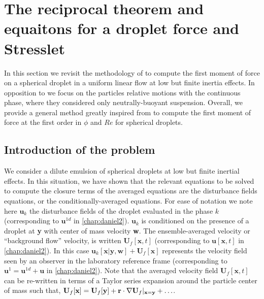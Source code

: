 \section{The reciprocal theorem and equaitons for a droplet force and Stresslet}
\label{ap:reciprocal}


In this section we revisit the methodology of \citet{stone2001inertial,raja2010inertial,jiang2021inertial}  to compute the first moment of force on a spherical droplet in a uniform linear flow at low but finite inertia effects. 
In opposition to \citet{stone2001inertial,raja2010inertial} we focus on the particles relative motions with the continuous phase, where they considered only neutrally-buoyant suspension. 
Overall, we provide a general method greatly inspired from \citet{stone2001inertial} to compute the first moment of force at the first order in $\phi$ and $Re$ for spherical droplets. 


\subsection{Introduction of the problem}

We consider a dilute emulsion of spherical droplets at low but finite inertial effects. 
In this situation, we have shown that the relevant equations to be solved to compute the closure terms of the averaged equations are the disturbance fields equations, or the conditionally-averaged equations. 
For ease of notation we note here $\textbf{u}_k$ the disturbance fields of the droplet evaluated in the phase $k$ (corresponding to $\textbf{u}^{1d}$ in \ref{chap:daniel2}). 
$\textbf{u}_k$ is conditioned on the presence of a droplet at \textbf{y} with center of mass velocity \textbf{w}.
The ensemble-averaged velocity or ``background flow'' velocity, is written $\textbf{U}_f[\textbf{x},t]$ (corresponding to $\textbf{u}[\textbf{x},t]$ in \ref{chap:daniel2}). 
In this case $\textbf{u}_k[\textbf{x}|\textbf{y},\textbf{w}] + \textbf{U}_f[\textbf{x}]$ represents the velocity field seen by an observer in the laboratory reference frame (corresponding to $\textbf{u}^1 = \textbf{u}^{1d} + \textbf{u}$ in \ref{chap:daniel2}).
Note that the averaged velocity field $\textbf{U}_f[\textbf{x},t]$ can be re-written in terms of a Taylor series expansion around the particle center of mass such that, $\textbf{U}_f[\textbf{x}] = \textbf{U}_f[\textbf{y}] + \textbf{r} \cdot \mathbf{\nabla} \textbf{U}_f|_{\textbf{x} =\textbf{y}} + \ldots$. 

